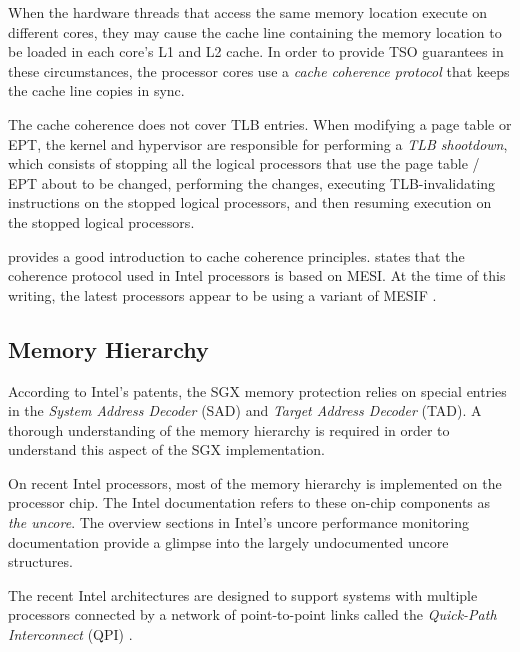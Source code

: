 When the hardware threads that access the same memory location execute on
different cores, they may cause the cache line containing the memory location
to be loaded in each core's L1 and L2 cache. In order to provide TSO guarantees
in these circumstances, the processor cores use a \textit{cache coherence
protocol} that keeps the cache line copies in sync.


The cache coherence does not cover TLB entries. When modifying a page table
or EPT, the kernel and hypervisor are responsible for performing a
\textit{TLB shootdown}, which consists of stopping all the logical processors
that use the page table / EPT about to be changed, performing the changes,
executing TLB-invalidating instructions on the stopped logical processors, and
then resuming execution on the stopped logical processors.

\cite{hennessy2012architecture} provides a good introduction to cache coherence
principles. \cite{intel2014manual} states that the coherence protocol used in
Intel processors is based on MESI. At the time of this writing, the latest
processors appear to be using a variant of
MESIF \cite{goodman2009mesif, ziakas2010qpi, intel2009qpi}.


\subsection{Memory Hierarchy}
\label{sec:uncore}

According to Intel's patents, the SGX memory protection relies on special
entries in the \textit{System Address Decoder} (SAD) and \textit{Target Address
Decoder} (TAD).  A thorough understanding of the memory hierarchy is required
in order to understand this aspect of the SGX implementation.

On recent Intel processors, most of the memory hierarchy is implemented on the
processor chip. The Intel documentation refers to these on-chip components as
\textit{the uncore}. The overview sections in Intel's uncore performance
monitoring documentation \cite{intel2014uncore, intel2012uncore,
intel2010uncore} provide a glimpse into the largely undocumented uncore
structures.

The recent Intel architectures are designed to support systems with multiple
processors connected by a network of point-to-point links called the
\textit{Quick-Path Interconnect} (QPI) \cite{intel2009qpi}.

